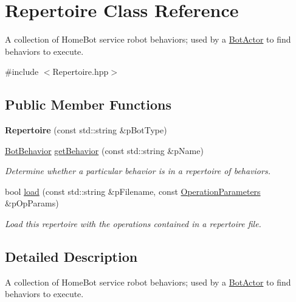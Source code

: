\hypertarget{classRepertoire}{\section{Repertoire Class Reference}
\label{classRepertoire}
}


A collection of Home\-Bot service robot behaviors; used by a \hyperlink{classBotActor}{Bot\-Actor} to find behaviors to execute.  




{\ttfamily \#include $<$Repertoire.\-hpp$>$}

\subsection*{Public Member Functions}
\begin{DoxyCompactItemize}
\item 
\hypertarget{classRepertoire_a9dd06d2b7804025aba51d5b371d32c28}{{\bfseries Repertoire} (const std\-::string \&p\-Bot\-Type)}\label{classRepertoire_a9dd06d2b7804025aba51d5b371d32c28}

\item 
\hyperlink{classBotBehavior}{Bot\-Behavior} \hyperlink{classRepertoire_a758b2c4e9c9c3b3ca18affa27bd6c48e}{get\-Behavior} (const std\-::string \&p\-Name)
\begin{DoxyCompactList}\small\item\em Determine whether a particular behavior is in a repertoire of behaviors. \end{DoxyCompactList}\item 
bool \hyperlink{classRepertoire_ac0da6e67b445515bd8786a10d50c29ad}{load} (const std\-::string \&p\-Filename, const \hyperlink{classOperationParameters}{Operation\-Parameters} \&p\-Op\-Params)
\begin{DoxyCompactList}\small\item\em Load this repertoire with the operations contained in a repertoire file. \end{DoxyCompactList}\end{DoxyCompactItemize}


\subsection{Detailed Description}
A collection of Home\-Bot service robot behaviors; used by a \hyperlink{classBotActor}{Bot\-Actor} to find behaviors to execute. 

